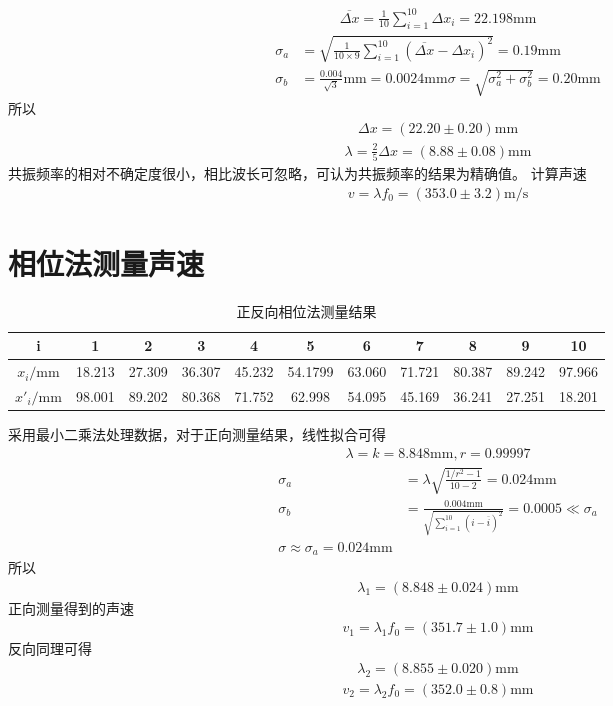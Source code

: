 \documentclass[a4paper]{ctexart}
\begin{document}
	\begin{align}
		\overline{\Delta x}=\frac{1}{10}\sum_{i=1}^{10}\Delta x_i=22.198\mathrm{mm}
	\end{align}
	\begin{align}
		\sigma_a&=\sqrt{\frac{1}{10\times9}\sum_{i=1}^{10}(\overline{\Delta x}-\Delta x_i)^2}=0.19\mathrm{mm}\\
		\sigma_b&=\frac{0.004}{\sqrt{3}}\mathrm{mm}=0.0024\mathrm{mm}
		\sigma=\sqrt{\sigma_a^2+\sigma_b^2}=0.20\mathrm{mm}
	\end{align}
	所以
	\begin{align}
		\Delta x=(22.20\pm0.20)\mathrm{mm}
	\end{align}
	\begin{align}
		\lambda=\frac{2}{5}\Delta x=(8.88\pm 0.08)\mathrm{mm}
	\end{align}
	共振频率的相对不确定度很小，相比波长可忽略，可认为共振频率的结果为精确值。
	计算声速
	\begin{align}
		v=\lambda f_0=(353.0\pm3.2)\mathrm{m/s}
	\end{align}
	\section{相位法测量声速}
	\begin{table}[H]
	\begin{center}
		\caption{正反向相位法测量结果}
		\begin{tabular}{c|cccccccccc}
			i&1&2&3&4&5&6&7&8&9&10\\
			\hline
			$x_i/\mathrm{mm}$&18.213&27.309&36.307&45.232&54.1799&63.060&71.721&80.387&89.242&97.966\\
			\hline
			$x'_i/\mathrm{mm}$&98.001&89.202&80.368&71.752&62.998&54.095&45.169&36.241&27.251&18.201
		\end{tabular}
	\end{center}
	\end{table}
	采用最小二乘法处理数据，对于正向测量结果，线性拟合可得
	\begin{align}
	\lambda=k=8.848\mathrm{mm},r=0.99997
	\end{align}
	\begin{align}
	\sigma_a&=\lambda\sqrt{\frac{1/r^2-1}{10-2}}=0.024\mathrm{mm}\\
	\sigma_b&=\frac{0.004\mathrm{mm}}{\sqrt{\sum_{i=1}^{10}(i-\overline{i})^2}}=0.0005\ll \sigma_a\\
	\sigma\approx\sigma_a=0.024\mathrm{mm}
	\end{align}
	所以
	\begin{align}
	\lambda_1=(8.848\pm0.024)\mathrm{mm}
	\end{align}
	正向测量得到的声速
	\begin{align}
	v_1=\lambda_1 f_0=(351.7\pm1.0)\mathrm{mm}
	\end{align}
	反向同理可得
	\begin{align}
	\lambda_2=(8.855\pm0.020)\mathrm{mm}
	\end{align}
	\begin{align}
	v_2=\lambda_2 f_0=(352.0\pm0.8)\mathrm{mm}
	\end{align}
\end{document}
